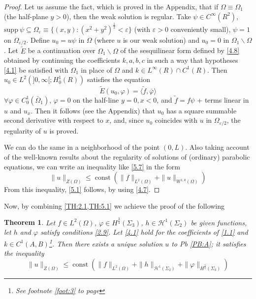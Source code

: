 \documentclass[a4paper,12pt,leqno]{article}
\newtheorem{theorem}[proposition]{Theorem}
\numberwithin{equation}{section}
\begin{document}
\begin{proof}
Let us assume the fact, which is proved in the Appendix, that if $\Omega \equiv \Omega_{1}$ (the half-plane $y>0$), then the weak solution is regular. Take $\psi \in C^{\infty}\left(R^{2}\right)$, $\mathrm{supp~} \psi \subseteq \Omega_{\varepsilon} \equiv\{(x, y):\left(x^{2}+y^{2}\right)^{\frac{1}{2}}<\varepsilon\}$ (with $\varepsilon>0$ conveniently small), $\psi=1$ on $\Omega_{\varepsilon / 2}$. Define $u_{0}=u \psi$ in $\Omega$ (where $u$ is our weak solution) and $u_{0}=0$ in $\Omega_{1} \backslash \Omega$. Let $\tilde{E}$ be a continuation over $\Omega_{1} \backslash \Omega$ of the sesquilinear form defined by \eqref{4.8} obtained by continuing the coefficients $k, a, b, c$ in such a way that hypotheses \eqref{4.1} be satisfied with $\Omega_{1}$ in place of $\Omega$ and $k \in L^{\infty}(R) \cap C^{1}(R)$. Then $u_{0} \in L^{2}(] 0, \infty[; H_{0}^{1}(R))$ satisfies the equation
\begin{equation*}
	\tilde{E}\left(u_{0}, \varphi\right)=\langle\tilde{f}, \bar{\varphi}\rangle
\end{equation*}
$\forall \varphi \in C_{0}^{1}\left(\bar{\Omega}_{1}\right)$, $\varphi=0$ on the half-line $y=0, x<0$, and $\tilde{f}=f \psi$ + terms linear in $u$ and $u_{x}$. Then it follows (see the Appendix) that $u_{0}$ has a square summable second derivative with respect to $x$, and, since $u_{0}$ coincides with $u$ in $\Omega_{\varepsilon / 2}$, the regularity of $u$ is proved.

We can do the same in a neighborhood of the point $(0, L)$. Also taking account of the well-known results about the regularity of solutions of (ordinary) parabolic equations, we can write an inequality like \eqref{5.7} in the form
\begin{equation*}
	\|u\|_{Z(\Omega)} \leqslant \operatorname{const} \left(\|f\|_{L^2(\Omega)}+\|u\|_{W^{1,0}(\Omega)}\right)
\end{equation*}
From this inequality, \eqref{5.1} follows, by using \eqref{4.7}.
\end{proof}

Now, by combining \cref{TH:2.1,TH:5.1} we achieve the proof of the following

\begin{theorem} \label{TH:5.2}
	Let $f \in L^{2}(\Omega)$, $\varphi \in H^{\frac 3 4}\left(\Sigma_{3}\right)$, $h \in \mathscr{H}^{1}\left(\Sigma_{2}\right)$ be given functions, let $h$ and $\varphi$ satisfy conditions \eqref{2.9}. 
	Let \eqref{4.1} hold for the coefficients of \cref{1.1} and $k \in C^{1}(A, B)$\footnote{See footnote \ref{foot:3} to page \pageref{foot:3}}. Then there exists a unique solution $u$ to Pb \ref{PB:A}; it satisfies the inequality
	\begin{equation} \label{5.13} \tag{5.13}
		\|u\|_{Z(\Omega)} 
		\leqslant 
		\operatorname{const}
		\left(
		\|f\|_{L^2(\Omega)} + 
		\|h\|_{\mathscr{H}^1(\Sigma_2)} +
		\|\varphi\|_{H^{\frac 3 4}(\Sigma_3)}
		\right)
	\end{equation}
\end{theorem}
\end{document}
